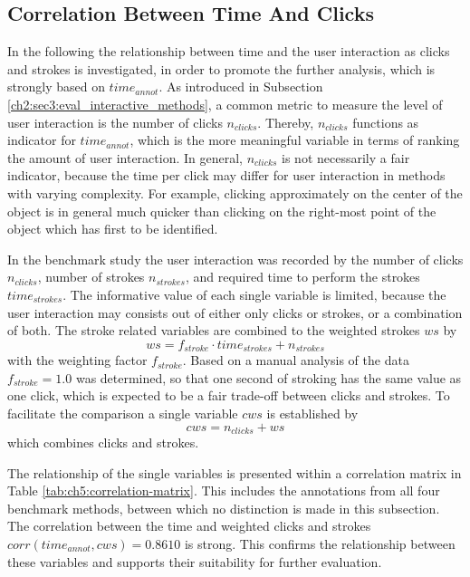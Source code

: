 \subsection{Correlation Between Time And Clicks}\label{ord:ch5:sec1:subsec1}

In the following the relationship between time and the user interaction as clicks and strokes is investigated, in order to promote the further analysis, which is strongly based on $time_{annot}$. 
As introduced in Subsection \ref{ch2:sec3:eval_interactive_methods}, a common metric to measure the level of user interaction is the number of clicks $n_{clicks}$.
Thereby, $n_{clicks}$ functions as indicator for $time_{annot}$, which is the more meaningful variable in terms of ranking the amount of user interaction.
In general, $n_{clicks}$ is not necessarily a fair indicator, because the time per click may differ for user interaction in methods with varying complexity.
For example, clicking approximately on the center of the object is in general much quicker than clicking on the right-most point of the object which has first to be identified.

In the benchmark study the user interaction was recorded by the number of clicks $n_{clicks}$, number of strokes $n_{strokes}$, and required time to perform the strokes $time_{strokes}$.
The informative value of each single variable is limited, because the user interaction may consists out of either only clicks or strokes, or a combination of both.
The stroke related variables are combined to the weighted strokes $ ws $ by
\begin{equation} \label{equ:ws}
	ws = f_{stroke} \cdot time_{strokes} + n_{strokes} 
\end{equation}
with the weighting factor $ f_{stroke} $.
Based on a manual analysis of the data $ f_{stroke} = 1.0 $ was determined, so that one second of stroking has the same value as one click, which is expected to be a fair trade-off between clicks and strokes.
To facilitate the comparison a single variable $ cws $ is established by 
\begin{equation}
	cws = n_{clicks} + ws
\end{equation}
which combines clicks and strokes.

The relationship of the single variables is presented within a correlation matrix in Table \ref{tab:ch5:correlation-matrix}.
This includes the annotations from all four benchmark methods, between which no distinction is made in this subsection.
The correlation between the time and weighted clicks and strokes $ corr \left(time_{annot}, cws \right) = 0.8610 $ is strong.
This confirms the relationship between these variables and supports their suitability for further evaluation.

